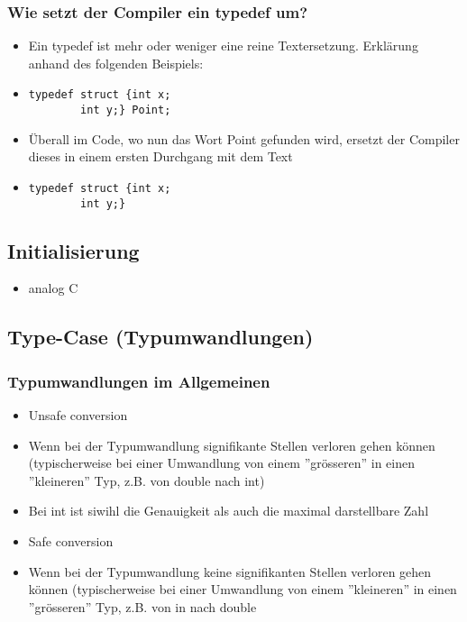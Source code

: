 \subsubsection{Wie setzt der Compiler ein typedef um?\hfill}
\label{sec:unterunterabschnitt}
\begin{itemize}
	\item Ein typedef ist mehr oder weniger eine reine Textersetzung. Erklärung anhand des folgenden Beispiels:
	\item[\-]
\noindent
\begin{minipage}{\linewidth}
\begin{lstlisting}
typedef struct {int x;
		int y;} Point;
\end{lstlisting}
\end{minipage}
	\item Überall im Code, wo nun das Wort Point gefunden wird, ersetzt der Compiler dieses in einem ersten Durchgang mit dem Text 
	\item[\-]
\noindent
\begin{minipage}{\linewidth}
\begin{lstlisting}
typedef struct {int x;
		int y;}
\end{lstlisting}
\end{minipage}	
\end{itemize}

\subsection{Initialisierung\hfill}
\label{sec:unterabschnitt}
\begin{itemize}
	\item analog C
\end{itemize}

\subsection{Type-Case (Typumwandlungen)\hfill}
\label{sec:unterabschnitt}

\subsubsection{Typumwandlungen im Allgemeinen\hfill}
\label{sec:unterunterabschnitt}
\begin{itemize}
	\item Unsafe conversion
	\item[\-] Wenn bei der Typumwandlung signifikante Stellen verloren gehen können (typischerweise bei einer Umwandlung von einem ''grösseren'' in einen ''kleineren'' Typ, z.B. von double nach int)
	\item[\-] Bei int ist siwihl die Genauigkeit als auch die maximal darstellbare Zahl
	\item Safe conversion
	\item[\-] Wenn bei der Typumwandlung keine signifikanten Stellen verloren gehen können (typischerweise bei einer Umwandlung von einem ''kleineren'' in einen ''grösseren'' Typ, z.B. von in nach double
\end{itemize}

